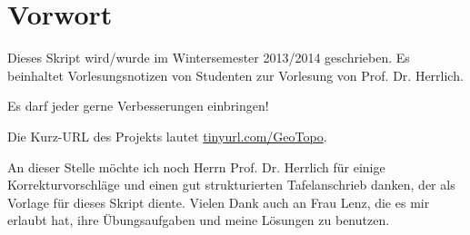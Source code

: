 \chapter*{Vorwort}
Dieses Skript wird/wurde im Wintersemester 2013/2014 geschrieben.
Es beinhaltet Vorlesungsnotizen von Studenten zur Vorlesung von
Prof. Dr. Herrlich.

Es darf jeder gerne Verbesserungen einbringen!

Die Kurz-URL des Projekts lautet \href{http://tinyurl.com/GeoTopo}{tinyurl.com/GeoTopo}.

An dieser Stelle möchte ich noch Herrn Prof. Dr. Herrlich 
für einige Korrekturvorschläge und einen gut strukturierten 
Tafelanschrieb danken, der als Vorlage für dieses Skript diente.
Vielen Dank auch an Frau Lenz, die es mir erlaubt hat, ihre 
Übungsaufgaben und meine Lösungen zu benutzen.
